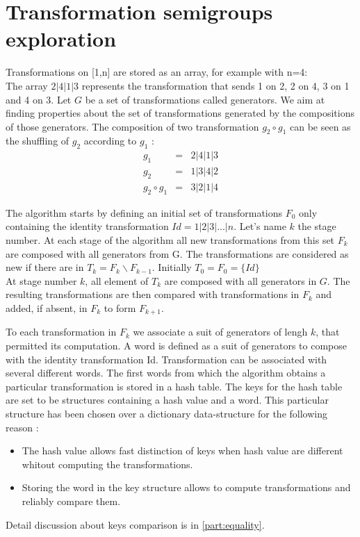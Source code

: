 {\section{Transformation semigroups exploration}
\label{note}
Transformations on [1,n] are stored as an array, for example with n=4:\\
The array $2|4|1|3$ represents the transformation that sends 1 on 2, 2 on 4, 3 on 1 and 4 on 3.
Let $G$ be a set of transformations called generators. We aim at finding properties about the set of transformations generated by the compositions of those generators.
The composition of two transformation $g_2\circ g_1$ can be seen as the shuffling of $g_2$ according to $g_1$ :
\begin{eqnarray*}
g_1 &=& 2|4|1|3\\
g_2 &=& 1|3|4|2\\
g_2\circ g_1 &=& 3|2|1|4
\end{eqnarray*}

The algorithm starts by defining an initial set of transformations $F_0$ only containing the identity transformation $Id = 1|2|3|...|n$.
Let's name $k$ the stage number.
At each stage of the algorithm all new transformations from this set $F_k$ are composed with all generators from G.
The transformations are considered as new if there are in $T_k=F_k \backslash F_{k-1}$.
Initially $T_0 = F_0 = \{Id\}$\\
At stage number $k$, all element of $T_k$ are composed with all generators in $G$. 
The resulting transformations are then compared with transformations in $F_k$ and added, if absent, in $F_k$ to form $F_{k+1}$.

To each transformation in $F_k$ we associate a suit of generators of lengh $k$, that permitted its computation.
A word is defined as a suit of generators to compose with the identity transformation Id.
Transformation can be associated with several different words.
The first words from which the algorithm obtains a particular transformation is stored in a hash table.
The keys for the hash table are set to be structures containing a hash value and a word. 
This particular structure has been chosen over a dictionary data-structure for the following reason :
\begin{itemize}
\item The hash value allows fast distinction of keys when hash value are different whitout computing the transformations.
\item Storing the word in the key structure allows to compute transformations and reliably compare them.
\end{itemize}
Detail discussion about keys comparison is in \autoref{part:equality}.

}
